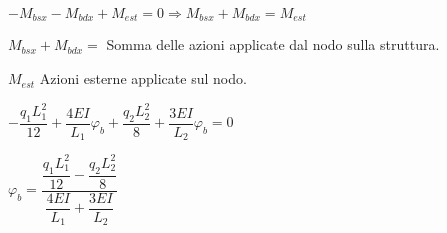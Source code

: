 \documentclass[a4paper,12pt, oneside]{book}
\begin{document}
	\phantom{text}
	
	$ -M_{bsx}-M_{bdx}+M_{est}=0 \Rightarrow M_{bsx}+M_{bdx}=M_{est} $
	
	\phantom{text}
	
	$M_{bsx}+M_{bdx}=$ Somma delle azioni applicate dal nodo sulla struttura.
	
	$M_{est}$ Azioni esterne applicate sul nodo.
	
	\phantom{text}
	
	$-\dfrac{q_1 L_1^{2}}{12}+\dfrac{4EI}{L_1}\varphi_b+\dfrac{q_2 L_2^{2}}{8}+\dfrac{3EI}{L_2}\varphi_b=0$
	
	\phantom{text}
	
	\phantom{text}
	
	$ \varphi_b=\dfrac{\dfrac{q_1 L_1^{2}}{12}-\dfrac{q_2 L_2^{2}}{8}}{\dfrac{4EI}{L_1}+\dfrac{3EI}{L_2}} $
	
	
\end{document}
